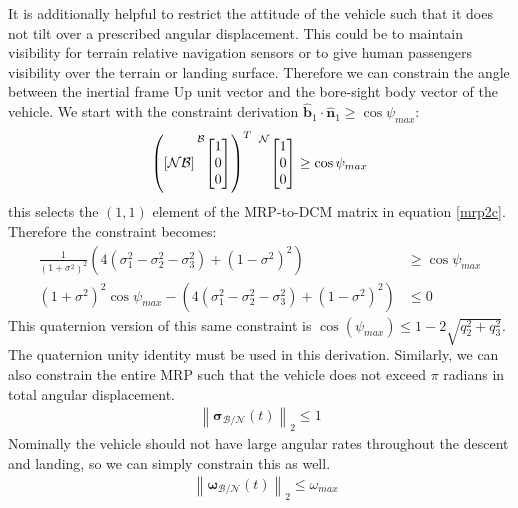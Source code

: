 It is additionally helpful to restrict the attitude of the vehicle such that it does not tilt over a prescribed angular displacement. This could be to maintain visibility for terrain relative navigation sensors or to give human passengers visibility over the terrain or landing surface. Therefore we can constrain the angle between the inertial frame Up unit vector and the bore-sight body vector of the vehicle. We start with the constraint derivation $\hat{\bm{b}}_1 \cdot \hat{\bm{n}}_1 \geq \cos{\psi_{max}}$:
\begin{align}
	\left (
	[\mathcal{NB}]
	\prescript{\mathcal{B}}{}{
	\begin{bmatrix}
		1 \\ 0 \\ 0
	\end{bmatrix}}
	\right )^T \
	\prescript{\mathcal{N}}{}{
	\begin{bmatrix}
		1 \\  0 \\ 0
	\end{bmatrix}}
	\geq \cos{\psi_{max}}
\end{align}
this selects the $(1,1)$ element of the MRP-to-DCM matrix in equation \ref{mrp2c}. Therefore the constraint becomes:
%
\begin{align}
	\frac{1}{(1+\sigma^2)^2}\left(4(\sigma_1^2 - \sigma_2^2 - \sigma_3^2) + (1-\sigma^2)^2 \right) &\geq \cos{\psi_{max}} \\
	(1+\sigma^2)^2\cos{\psi_{max}} - \left(4(\sigma_1^2 - \sigma_2^2 - \sigma_3^2) + (1-\sigma^2)^2 \right) &\leq 0
\end{align}
This quaternion version of this same constraint is $\cos(\psi_{max}) \leq 1-2\sqrt{q_{2}^{2}+q_{3}^{2}}$. The quaternion unity identity must be used in this derivation. Similarly, we can also constrain the entire MRP such that the vehicle does not exceed $\pi$ radians in total angular displacement.
\begin{align}
	\left \lVert \boldsymbol{\sigma}_\mathcal{B/N} (t) \right \lVert_2 \leq 1
\end{align}
Nominally the vehicle should not have large angular rates throughout the descent and landing, so we can simply constrain this as well.
\begin{align}
& \left \lVert \bm{\omega}_\mathcal{B/N}(t) \right \lVert_2 \leq \omega_{max}
\end{align}

